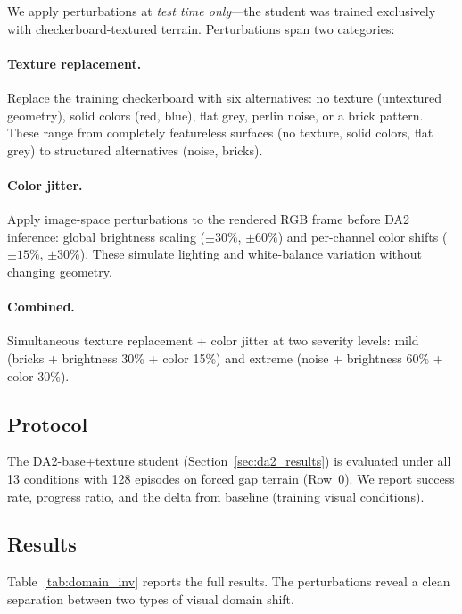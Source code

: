 \documentclass[10pt,twocolumn]{article}
\begin{document}
We apply perturbations at \emph{test time only}---the student was
trained exclusively with checkerboard-textured terrain.  Perturbations
span two categories:

\paragraph{Texture replacement.}
Replace the training checkerboard with six alternatives: no texture
(untextured geometry), solid colors (red, blue), flat grey, perlin
noise, or a brick pattern.  These range from completely featureless
surfaces (no texture, solid colors, flat grey) to structured
alternatives (noise, bricks).

\paragraph{Color jitter.}
Apply image-space perturbations to the rendered RGB frame before DA2
inference: global brightness scaling ($\pm30\%$, $\pm60\%$) and
per-channel color shifts ($\pm15\%$, $\pm30\%$).  These simulate
lighting and white-balance variation without changing geometry.

\paragraph{Combined.}
Simultaneous texture replacement + color jitter at two severity
levels: mild (bricks + brightness 30\% + color 15\%) and extreme
(noise + brightness 60\% + color 30\%).

\subsection{Protocol}

The DA2-base+texture student (Section~\ref{sec:da2_results}) is
evaluated under all 13 conditions with 128 episodes on forced gap
terrain (Row~0).  We report success rate, progress ratio, and
the delta from baseline (training visual conditions).

\subsection{Results}

Table~\ref{tab:domain_inv} reports the full results.  The
perturbations reveal a clean separation between two types of
visual domain shift.
\end{document}
